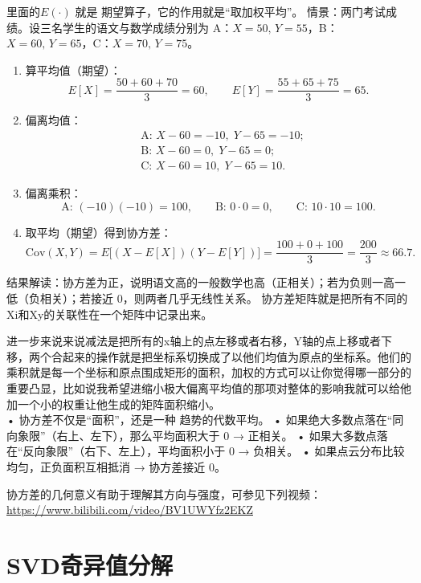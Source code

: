 里面的$ E(\cdot)$ 就是 期望算子，它的作用就是“取加权平均”。
情景：两门考试成绩。设三名学生的语文与数学成绩分别为
A：$X=50,\,Y=55$，B：$X=60,\,Y=65$，C：$X=70,\,Y=75$。

\begin{enumerate}
  \item 算平均值（期望）：
  \[
    E[X]=\frac{50+60+70}{3}=60,\qquad
    E[Y]=\frac{55+65+75}{3}=65.
  \]
  \item 偏离均值：
  \[
  \begin{aligned}
    &\text{A: }X-60=-10,\; Y-65=-10;\\
    &\text{B: }X-60=0,\;   Y-65=0;\\
    &\text{C: }X-60=10,\;  Y-65=10.
  \end{aligned}
  \]
  \item 偏离乘积：
  \[
    \text{A: }(-10)(-10)=100,\qquad
    \text{B: }0\cdot 0=0,\qquad
    \text{C: }10\cdot 10=100.
  \]
  \item 取平均（期望）得到协方差：
  \[
    \mathrm{Cov}(X,Y)
    =E\!\big[(X-E[X])(Y-E[Y])\big]
    =\frac{100+0+100}{3}
    =\frac{200}{3}\approx 66.7.
  \]
\end{enumerate}

结果解读：协方差为正，说明语文高的一般数学也高（正相关）；若为负则一高一低（负相关）；若接近 $0$，则两者几乎无线性关系。
协方差矩阵就是把所有不同的Xi和Xy的关联性在一个矩阵中记录出来。
\begin{dxtips}
    进一步来说来说减法是把所有的x轴上的点左移或者右移，Y轴的点上移或者下移，两个合起来的操作就是把坐标系切换成了以他们均值为原点的坐标系。他们的乘积就是每一个坐标和原点围成矩形的面积，加权的方式可以让你觉得哪一部分的重要凸显，比如说我希望进缩小极大偏离平均值的那项对整体的影响我就可以给他加一个小的权重让他生成的矩阵面积缩小。
 \\
	•	协方差不仅是“面积”，还是一种 趋势的代数平均。
	•	如果绝大多数点落在“同向象限”（右上、左下），那么平均面积大于 0 → 正相关。
	•	如果大多数点落在“反向象限”（右下、左上），平均面积小于 0 → 负相关。
	•	如果点云分布比较均匀，正负面积互相抵消 → 协方差接近 0。
\end{dxtips}
协方差的几何意义有助于理解其方向与强度，可参见下列视频：\url{https://www.bilibili.com/video/BV1UWYfz2EKZ}









\section{SVD奇异值分解}


